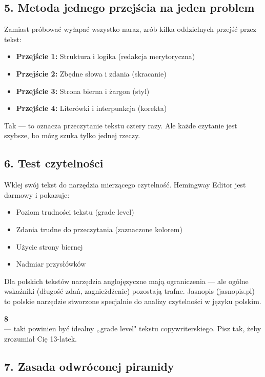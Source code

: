 \documentclass[
  12pt,
  a4paper,
  twoside,
  openright,
  12pt,
  DIV=12,
  BCOR=12mm]{scrbook}
\providecommand{\tightlist}{%
  \setlength{\itemsep}{0pt}\setlength{\parskip}{0pt}}\usepackage{longtable,booktabs,array}
\newcommand{\stathighlight}[2]{%
  \begin{center}
    \begin{tcolorbox}[
      enhanced,
      colback=primarylight,
      colframe=primaryblue,
      boxrule=1pt,
      arc=5pt,
      width=0.6\textwidth,
      halign=center
    ]
      {\fontsize{36}{40}\selectfont\bfseries\color{primarydark}#1}\\[5pt]
      {\color{textmuted}#2}
    \end{tcolorbox}
  \end{center}
}
\begin{document}
\subsection{5. Metoda jednego przejścia na jeden
problem}\label{metoda-jednego-przejux15bcia-na-jeden-problem}

Zamiast próbować wyłapać wszystko naraz, zrób kilka oddzielnych przejść
przez tekst:

\begin{itemize}
\tightlist
\item
  \textbf{Przejście 1:} Struktura i logika (redakcja merytoryczna)
\item
  \textbf{Przejście 2:} Zbędne słowa i zdania (skracanie)
\item
  \textbf{Przejście 3:} Strona bierna i żargon (styl)
\item
  \textbf{Przejście 4:} Literówki i interpunkcja (korekta)
\end{itemize}

Tak --- to oznacza przeczytanie tekstu cztery razy. Ale każde czytanie
jest szybsze, bo mózg szuka tylko jednej rzeczy.

\subsection{6. Test czytelności}\label{test-czytelnoux15bci}

Wklej swój tekst do narzędzia mierzącego czytelność. Hemingway Editor
jest darmowy i pokazuje:

\begin{itemize}
\tightlist
\item
  Poziom trudności tekstu (grade level)
\item
  Zdania trudne do przeczytania (zaznaczone kolorem)
\item
  Użycie strony biernej
\item
  Nadmiar przysłówków
\end{itemize}

Dla polskich tekstów narzędzia anglojęzyczne mają ograniczenia --- ale
ogólne wskaźniki (długość zdań, zagnieżdżenie) pozostają trafne.
Jasnopis (jasnopis.pl) to polskie narzędzie stworzone specjalnie do
analizy czytelności w języku polskim.

\stathighlight{8}{--- taki powinien być idealny „grade level" tekstu copywriterskiego. Pisz tak, żeby zrozumiał Cię 13-latek.}

\subsection{7. Zasada odwróconej
piramidy}\label{zasada-odwruxf3conej-piramidy-1}
\end{document}
